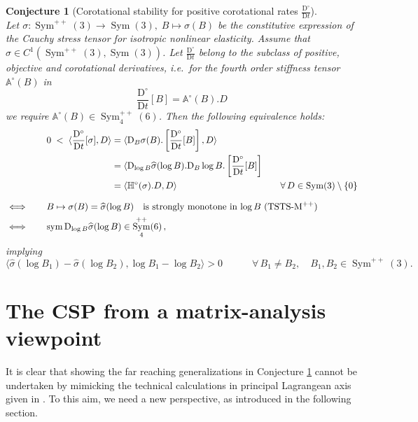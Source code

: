\documentclass[10pt]{article}
\newcounter{theoremCounter}
\numberwithin{theoremCounter}{section}
\theoremstyle{plain}
\newtheorem{conjecture}[theoremCounter]{Conjecture}
\theoremstyle{definition}
\newcommand{\DD}{\mathrm{D}}
\DeclareMathOperator{\Sym}{Sym}
\DeclareMathOperator{\sym}{sym}
\def\H{\mathbb{H}}
\numberwithin{equation}{section}
\begin{document}
%
	\begin{conjecture}[Corotational stability for positive corotational rates $\frac{\DD^{\circ}}{\DD t}$] \label{conjCSPgeneral}
	~\\Let $\sigma\colon \Sym^{++}(3) \to \Sym(3), \; B \mapsto \sigma(B)$ be the constitutive expression of the Cauchy stress tensor for isotropic nonlinear elasticity. Assume that $\sigma \in C^1(\Sym^{++}(3), \Sym(3))$. Let $\frac{\DD^{\circ}}{\DD t}$ belong to the subclass of positive, objective and corotational derivatives, i.e.~for the fourth order stiffness tensor $\mathbb{A}^{\circ}(B)$ in 
	\begin{equation}
	\frac{\DD^{\circ}}{\DD t}[B] = \mathbb{A}^{\circ}(B).D
	\end{equation}
we require $\mathbb{A}^{\circ}(B) \in \Sym^{++}_4(6)$. Then the following equivalence holds:
	\begin{equation}
		\begin{alignedat}{2}
		&0 \;<\; \langle \frac{\DD^{\circ}}{\DD t}[\sigma], D \rangle &&= \langle \DD_B \sigma(B) . \left[\frac{\DD^{\circ}}{\DD t}[B]\right] , D \rangle \\&&&= \langle \DD_{\log B} \widehat \sigma(\log B). \DD_B \log B. \left[\frac{\DD^{\circ}}{\DD t}[B]\right] \\
		&&&= \mathrlap{\langle \H^{\circ}(\sigma).D, D \rangle} \hphantom{\langle \DD_{\log B} \widehat \sigma(\log B). \DD_B \log B. \left[\frac{\DD^{\circ}}{\DD t}[B]\right]} \qquad \forall \, D \in \Sym(3) \setminus \{0\} \\[.7em]
		\iff \qquad &\mathrlap{B \mapsto \sigma(B) = \widehat{\sigma}(\log B) \quad \textnormal{is strongly monotone in $\log B$ (TSTS-M$^{++}$)}} \\
		\iff \qquad &\mathrlap{\sym \DD_{\log B} \widehat \sigma(\log B) \in \Sym^{++}_4(6)\,,}
		\end{alignedat}
	\end{equation}
	implying
		\begin{equation}
		\langle \widehat{\sigma}(\log B_1) - \widehat{\sigma}(\log B_2), \log B_1 - \log B_2 \rangle > 0 \qquad \quad \forall \, B_1 \neq B_2, \quad B_1, B_2 \in \Sym^{++}(3).
		\end{equation}
	\end{conjecture}
%
\section{The CSP from a matrix-analysis viewpoint}
%
It is clear that showing the far reaching generalizations in Conjecture \ref{conjCSPgeneral} cannot be undertaken by mimicking the technical calculations in principal Lagrangean axis given in \cite{tobedone}. To this aim, we need a new perspective, as introduced in the following section.
%
\end{document}
